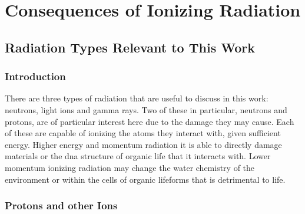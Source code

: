 \chapter{Consequences of Ionizing Radiation}
\label{chap:backgroundsources}

\begin{changemargin}{1.0cm}{1.0cm}
\end{changemargin}





\section{Radiation Types Relevant to This Work}


\subsection{Introduction}

There are three types of radiation that are useful to discuss in this work: neutrons, light ions and gamma rays.  Two of these in particular, neutrons and protons, are of particular interest here due to the damage they may cause.  Each of these are capable of ionizing the atoms they interact with, given sufficient energy.  Higher energy and momentum radiation it is able to directly damage materials or the \acrshort{dna} structure of organic life that it interacts with.  Lower momentum ionizing radiation may change the water chemistry of the environment or within the cells of organic lifeforms that is detrimental to life.



\subsection{Protons and other Ions}

